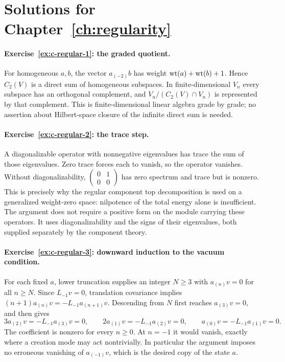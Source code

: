 \section{Solutions for Chapter~\ref{ch:regularity}}

\paragraph{Exercise~\ref{ex:c-regular-1}: the graded quotient.}
\label{sol:ex:c-regular-1}
For homogeneous $a,b$, the vector $a_{(-2)}b$ has weight
$\operatorname{wt}(a)+\operatorname{wt}(b)+1$. Hence $C_2(V)$ is a direct sum of homogeneous
subspaces. In finite-dimensional $V_n$ every subspace has an
orthogonal complement, and
$V_n/(C_2(V)\cap V_n)$ is represented by that complement.
This is finite-dimensional linear algebra grade by grade; no
assertion about Hilbert-space closure of the infinite direct sum
is needed.



\paragraph{Exercise~\ref{ex:c-regular-2}: the trace step.}
\label{sol:ex:c-regular-2}
A diagonalizable operator with nonnegative eigenvalues has trace the
sum of those eigenvalues. Zero trace forces each to vanish, so the
operator vanishes. Without diagonalizability,
$\left(\begin{smallmatrix}0&1\\0&0\end{smallmatrix}\right)$ has
zero spectrum and trace but is nonzero. This is precisely why the
regular component top decomposition is used on a generalized
weight-zero space: nilpotence of the total energy alone is insufficient.
The argument does not require a positive form on the module carrying
these operators. It uses diagonalizability and the signs of their
eigenvalues, both supplied separately by the component theory.



\paragraph{Exercise~\ref{ex:c-regular-3}: downward induction to the vacuum condition.}
\label{sol:ex:c-regular-3}
For each fixed $a$, lower truncation supplies an integer $N\geq3$ with
$a_{(n)}v=0$ for all $n\geq N$. Since $L_{-1}v=0$,
translation covariance implies
$(n+1)a_{(n)}v=-L_{-1}a_{(n+1)}v$.
Descending from $N$ first reaches $a_{(3)}v=0$, and then gives
\[
 3a_{(2)}v=-L_{-1}a_{(3)}v=0,\qquad
 2a_{(1)}v=-L_{-1}a_{(2)}v=0,\qquad
 a_{(0)}v=-L_{-1}a_{(1)}v=0.
\]
The coefficient is nonzero for every $n\geq0$. At $n=-1$ it
would vanish, exactly where a creation mode may act nontrivially.
In particular the argument imposes no erroneous vanishing of
$a_{(-1)}v$, which is the desired copy of the state $a$.



